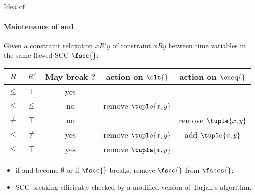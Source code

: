 \subsection{}
\begin{frame}{Idea of \DPASAT{}}
	\framesubtitle{Maintenance of \elt[\fscc{}] and \eneq[\fscc{}]}
	
	Given a constraint relaxation $xR'y$ of constraint $xRy$ between time variables in the same  flawed SCC $\fscc{}$:
	
	\begin{table}
		\begin{tabular}{cc||c|c|c}
			$R$			& $R'$		& May break \scc{}?	& action on $\elt{}$ & action on $\eneq{}$ \\ \hline
			$\leq$		& $\top$	& yes				& 					 & \\
			$<$			& $\leq$	& no				& remove $\tuple{x, y}$					 & \\
			$\not =$	& $\top$	& no				&					 & remove $\tuple{x, y}$ \\
			$<$			& $\not =$ 	& yes				& remove $\tuple{x, y}$ & add $\tuple{x, y}$ \\
			$<$			& $\top$	& yes				& remove $\tuple{x, y}$ & \\
		\end{tabular}
	\end{table}
	
	\begin{itemize}
		\item if \elt[\fscc{}] and \eneq[\fscc{}] become $\emptyset$ or if $\fscc{}$ breaks, remove $\fscc{}$ from $\fsccs{}$;
		\item SCC breaking efficiently checked by a modified version of Tarjan's algorithm.
	\end{itemize}
	
	
\end{frame}

